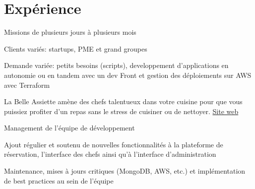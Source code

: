 \documentclass[
  french,
  a4paper
]{resume-openfont}
\begin{document}
\begin{minipage}[t]{0.66\textwidth}


\section{Expérience}

%
%
\vspace{1.5\topsep} %
\begin{tightemize}
\item Missions de plusieurs jours à plusieurs mois
\item Clients variés: startups, PME et grand groupes
\item Demande variée: petits besoins (scripts), developpement d'applications en autonomie ou en tandem avec un dev Front et gestion des déploiements sur AWS avec Terraform
\end{tightemize}
\sectionsep

%
%
La Belle Assiette amène des chefs talentueux dans votre cuisine pour que vous puissiez profiter d'un repas sans le stress de cuisiner ou de nettoyer. \href{https://labelleassiette.fr}{Site web}
\vspace{1.5\topsep} %
\begin{tightemize}
\item Management de l'équipe de développement
\item Ajout régulier et soutenu de nouvelles fonctionnalités à la plateforme de réservation, l'interface des chefs ainsi qu'à l'interface d'administration
\item Maintenance, mises à jours critiques (MongoDB, AWS, etc.) et implémentation de best practices au sein de l'équipe
\end{tightemize}
\sectionsep


\end{minipage}
\end{document}
